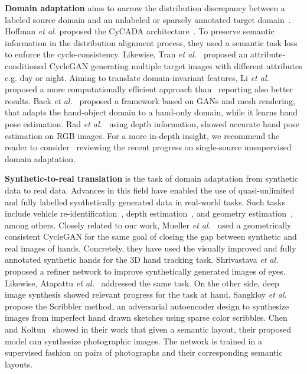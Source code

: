 \vspace*{0.1cm}\noindent\textbf{Domain adaptation} aims to narrow the distribution discrepancy between a labeled source domain and an unlabeled or sparsely annotated target domain~\cite{Zhao2020}. Hoffman \textit{et al.} proposed the \ac{CyCADA} architecture~\cite{Hoffman2018}. To preserve semantic information in the distribution alignment process, they used a semantic task loss to enforce the cycle-consistency. Likewise, Tran \textit{et al.}~\cite{Tran2019} proposed an attribute-conditioned \ac{CycleGAN} generating multiple target images with different attributes e.g. day or night. Aiming to translate domain-invariant features, Li \textit{et al.}~\cite{Li2019} proposed a more computationally efficient approach than~\cite{Hoffman2018} reporting also better results. Baek \textit{et al.}~\cite{baek2020weakly} proposed a framework based on \acp{GAN} and mesh rendering, that adapts the hand-object domain to a hand-only domain, while it learns hand pose estimation. Rad \textit{et al.}~\cite{rad2018domain} using depth information, showed accurate hand pose estimation on RGB images. For a more in-depth insight, we recommend the reader to consider~\cite{Zhao2020} reviewing the recent progress on single-source unsupervised domain adaptation.

\vspace*{0.1cm}\noindent\textbf{Synthetic-to-real translation} is the task of domain adaptation from synthetic data to real data. Advances in this field have enabled the use of quasi-unlimited and fully labelled synthetically generated data in real-world tasks. Such tasks include vehicle re-identification~\cite{Lee2020}, depth estimation~\cite{Maximov2020}, and geometry estimation~\cite{PNVR2020}, among others. Closely related to our work, Mueller \textit{et al.}~\cite{Mueller2018} used a geometrically consistent \ac{CycleGAN} for the same goal of closing the gap between synthetic and real images of hands. Concretely, they have used the visually improved and fully annotated synthetic hands for the 3D hand tracking task.  Shrivastava \textit{et al.}~\cite{Shrivastava2017} proposed a refiner network to improve synthetically generated images of eyes. Likewise, Atapattu \textit{et al.}~\cite{Atapattu2019} addressed the same task. On the other side, deep image synthesis showed relevant progress for the task at hand. Sangkloy \textit{et al.}~\cite{Sangkloy2017} propose the Scribbler method, an adversarial autoencoder design to synthesize images from imperfect hand drawn sketches using sparse color scribbles. Chen and Koltun~\cite{Chen2017} showed in their work that given a semantic layout, their proposed model can synthesize photographic images. The network is trained in a supervised fashion on pairs of photographs and their corresponding semantic layouts.

